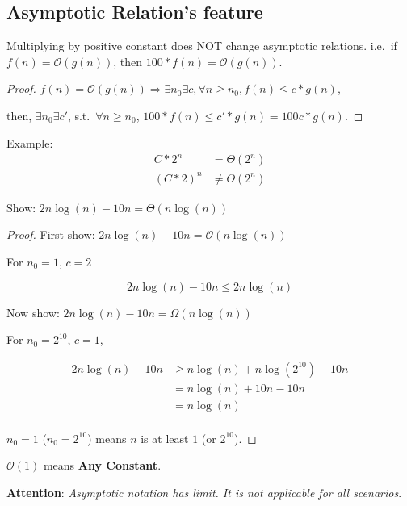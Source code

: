 \subsection{Asymptotic Relation's feature}
\begin{theorem}
Multiplying by positive constant does NOT change asymptotic relations.
i.e.\ if $f(n) = \mathcal{O}(g(n))$, then $100 * f(n) = \mathcal{O}(g(n))$.
\end{theorem}

\begin{proof}
$f(n) = \mathcal{O}(g(n)) \Rightarrow \exists{n_0} \exists c, \forall n \geq n_0, f(n) \leq c*g(n)$,

then, $\exists{n_0}\exists{c'}$, s.t.\ $\forall n \geq n_0$, $100*f(n) \leq c'*g(n) = 100c*g(n)$.
\end{proof}

Example:
\begin{align}
C*2^n & = \Theta(2^n) \\
(C*2)^n & \neq \Theta(2^n)
\end{align}

\begin{claim}
Show: $2n\log(n) - 10n = \Theta(n\log(n))$
\end{claim}

\begin{proof}
First show: $2n\log(n) - 10n = \mathcal{O}(n\log(n))$

For $n_0 = 1$, $c = 2$

\[2n\log(n) - 10n \leq 2n\log(n)\]

Now show: $2n\log(n) - 10n = \Omega(n\log(n))$

For $n_0 = 2^10$, $c = 1$,

\[
\begin{split}
2n\log(n) - 10n & \geq n\log(n) + n \log(2^{10}) - 10n \\
& =n \log(n) + 10n - 10n \\
& =n\log(n) \\
\end{split}
\]

$n_0 = 1$ ($n_0 = 2^{10}$) means $n$ is at least $1$ (or $2^10$).
\end{proof}

\begin{corollary}
$\mathcal{O}(1)$ means \textbf{Any Constant}.
\end{corollary}

\textbf{Attention}: \emph{Asymptotic notation has limit. It is not applicable for all scenarios}.

